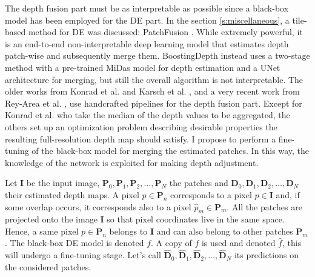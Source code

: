 The depth fusion part must be as interpretable as possible since a black-box model has been employed for the DE part.
In the section \ref{s:miscellaneous}, a tile-based method for DE was discussed: PatchFusion \cite{PatchFusion}.
While extremely powerful, it is an end-to-end non-interpretable deep learning model that estimates depth patch-wise and subsequently merge them.
BoostingDepth \cite{BoostingDepth} instead uses a two-stage method with a pre-trained MiDas \cite{MiDas} model for depth estimation and a UNet architecture for merging, but still the overall algorithm is not interpretable.
The older works from Konrad et al. \cite{konrad2} and Karsch et al. \cite{DepthTransfer}, and a very recent work from Rey-Area et al. \cite{360MonoDepth}, use handcrafted pipelines for the depth fusion part.
Except for Konrad et al. who take the median of the depth values to be aggregated, the others set up an optimization problem describing desirable properties the resulting full-resolution depth map should satisfy.
I propose to perform a fine-tuning of the black-box model for merging the estimated patches.
In this way, the knowledge of the network is exploited for making depth adjustment.

\vfill

Let $\mathbf{I}$ be the input image, $\mathbf{P}_{0}, \mathbf{P}_{1}, \mathbf{P}_{2}, \dotsc, \mathbf{P}_{N}$ the patches and $\mathbf{D}_{0}, \mathbf{D}_{1}, \mathbf{D}_{2}, \dotsc, \mathbf{D}_{N}$ their estimated depth maps.
A pixel $p \in \mathbf{P}_{n}$ corresponds to a pixel $\hat{p} \in \mathbf{I}$ and, if some overlap occurs, it corresponds also to a pixel $\hat{p}_{m} \in \mathbf{P}_{m}$.
All the patches are projected onto the image $\mathbf{I}$ so that pixel coordinates live in the same space.
Hence, a same pixel $p \in \mathbf{P}_{n}$ belongs to $\mathbf{I}$ and can also belong to other patches $\mathbf{P}_{m}$.
The black-box DE model is denoted $f$.
A copy of $f$ is used and denoted $\hat{f}$, this will undergo a fine-tuning stage.
Let's call $\hat{\mathbf{D}}_{0}, \hat{\mathbf{D}}_{1}, \hat{\mathbf{D}}_{2}, \dotsc, \hat{\mathbf{D}}_{N}$ its predictions on the considered patches.

